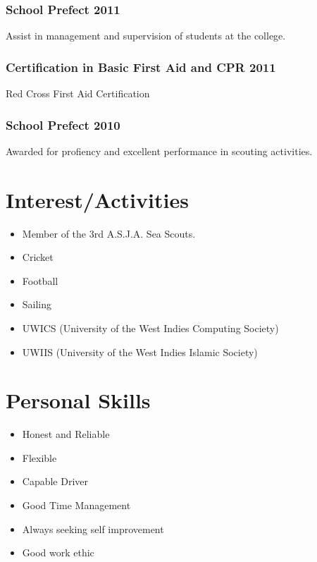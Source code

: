 \documentclass{article}
\begin{document}
\subsubsection{School Prefect \hfill{2011}}
\tab Assist in management and supervision of students at the college.
\subsubsection{Certification in Basic First Aid and CPR \hfill{2011}}
\tab Red Cross First Aid Certification 
\subsubsection{School Prefect \hfill{2010}}
\tab Awarded for profiency and excellent performance in scouting activities.

\section{Interest/Activities}
\begin{itemize}
	\item Member of the 3rd A.S.J.A. Sea Scouts.
 	\item Cricket
	\item Football
	\item Sailing
	\item UWICS (University of the West Indies Computing Society)
	\item UWIIS (University of the West Indies Islamic Society)	
\end{itemize}

\section{Personal Skills}
\begin{itemize}
	\item Honest and Reliable
	\item Flexible
	\item Capable Driver
	\item Good Time Management
	\item Always seeking self improvement
	\item Good work ethic
\end{itemize}
\end{document}
